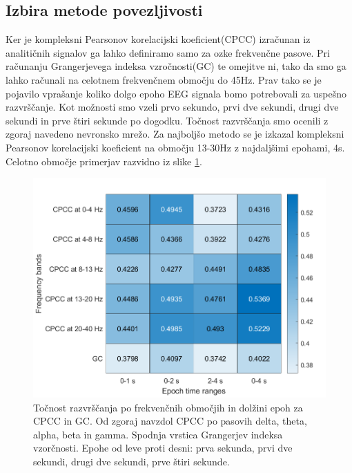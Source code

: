 \subsection{Izbira metode povezljivosti}
Ker je kompleksni Pearsonov korelacijski koeficient(CPCC) izračunan iz analitičnih signalov ga lahko definiramo samo za ozke frekvenčne pasove. Pri računanju Grangerjevega indeksa vzročnosti(GC) te omejitve ni, tako da smo ga lahko računali na celotnem frekvenčnem območju do 45Hz. Prav tako se je pojavilo vprašanje koliko dolgo epoho EEG signala bomo potrebovali za uspešno razvrščanje. Kot možnosti smo vzeli prvo sekundo, prvi dve sekundi, drugi dve sekundi in prve štiri sekunde po dogodku. Točnost razvrščanja smo ocenili z zgoraj navedeno nevronsko mrežo. Za najboljšo metodo se je izkazal kompleksni Pearsonov korelacijski koeficient na območju 13-30Hz z najdaljšimi epohami, 4s. Celotno območje primerjav razvidno iz slike \ref{slika:primerjava_obmocij}.
\begin{figure}
    \begin{center}
    \includegraphics[width=1\linewidth]{slike/Comparison.png}
    \end{center}
    \caption{Točnost razvrščanja po frekvenčnih območjih in dolžini epoh za CPCC in GC. Od zgoraj navzdol CPCC po pasovih delta, theta, alpha, beta in gamma. Spodnja vrstica Grangerjev indeksa vzorčnosti. Epohe od leve proti desni: prva sekunda, prvi dve sekundi, drugi dve sekundi, prve štiri sekunde.}
    \label{slika:primerjava_obmocij}
\end{figure}

\newpage
